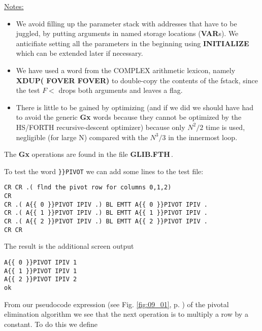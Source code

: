 \underline{Notes:}

\begin{itemize}
  \item We avoid filling up the parameter stack with addresses that have to be
      juggled, by putting arguments in named storage locations (\textbf{VAR}s).
        We anticifiate setting all the parameters in the beginning using
        \textbf{INITIALIZE} which can be extended later if necessary.
  \item We have used a word from the COMPLEX arithmetic lexicon, namely
      \textbf{XDUP( FOVER FOVER)} to double-copy the contents of the fstack,
        since the test $F<$ drops both arguments and leaves a flag.
  \item There is little to be gained by optimizing (and if we did we should
      have had to avoid the generic \textbf{Gx} words because they cannot be optimized
        by the HS/FORTH recursive-descent optimizer) because only $N^2/2$ time
        is used, negligible (for large N) compared with the $N^3/3$ in the
        innermost loop.
\end{itemize}

The \textbf{Gx} operations are found in the file \textbf{GLIB.FTH}\,.

To test the word \verb|}}PIVOT| we can add some lines to the test file:

\begin{verbatim}
CR CR .( flnd the pivot row for columns 0,1,2)
CR
CR .( A{{ 0 }}PIVOT IPIV .) BL EMTT A{{ 0 }}PIVOT IPIV .
CR .( A{{ 1 }}PIVOT IPIV .) BL EMTT A{{ 1 }}PIVOT IPIV .
CR .( A{{ 2 }}PIVOT IPIV .) BL EMTT A{{ 2 }}PIVOT IPIV .
CR CR
\end{verbatim}
The result is the additional screen output

\begin{verbatim}
A{{ 0 }}PIVOT IPIV 1
A{{ 1 }}PIVOT IPIV 1
A{{ 2 }}PIVOT IPIV 2
ok
\end{verbatim}

From our pseudocode expression (see Fig. \ref{fig:09_01}, p. \pageref{fig:09_01}) of the
pivotal elimination algorithm we see that the next operation is to
multiply a row by a constant. To do this we define

